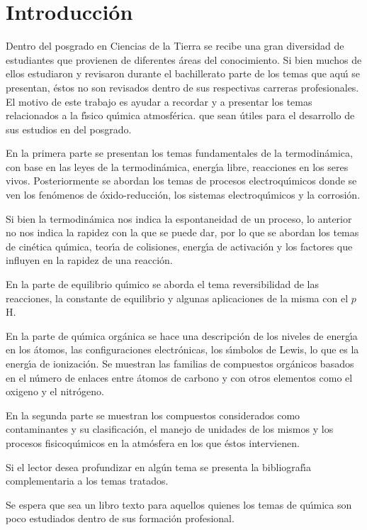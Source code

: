 \chapter*{Introducci\'on}

Dentro del posgrado en Ciencias de la Tierra se recibe una gran diversidad de estudiantes que provienen de diferentes \'areas del conocimiento. Si bien muchos de ellos estudiaron y revisaron durante el bachillerato parte de los temas que aqu\'{\i} se presentan, \'estos no son revisados dentro de sus respectivas carreras profesionales. El motivo de este trabajo es ayudar  a recordar y a presentar los temas relacionados a la f\'{\i}sico qu\'{\i}mica atmosf\'erica. que sean \'utiles para el desarrollo de sus estudios en del posgrado.

 En la primera parte se presentan los temas fundamentales de la termodin\'amica, con base en las leyes de la termodin\'amica, energ\'{\i}a libre, reacciones en los seres vivos. Posteriormente se abordan los temas de procesos electroqu\'{\i}micos donde se ven los fen\'omenos de \'oxido-reducci\'on, los sistemas electroqu\'{\i}micos y la corrosi\'on.
 
 Si bien la termodin\'amica nos indica la espontaneidad de un proceso, lo anterior no nos indica la rapidez con la que se puede dar, por lo que se abordan los temas de cin\'etica qu\'{\i}mica, teor\'{\i}a de colisiones, energ\'{\i}a de activaci\'on  y los factores que influyen en la rapidez de una reacci\'on.
 
 En la parte de equilibrio qu\'{\i}mico se aborda el tema reversibilidad de las reacciones, la constante de equilibrio y algunas aplicaciones de la misma con el $p$H.
 
 En la parte de qu\'{\i}mica org\'anica se hace una descripci\'on de los niveles de energ\'{\i}a en los \'atomos, las configuraciones electr\'onicas, los s\'{\i}mbolos de Lewis, lo que es la energ\'{\i}a de ionizaci\'on. Se muestran las familias de compuestos org\'anicos basados en el n\'umero de enlaces entre \'atomos de carbono y con otros elementos como el oxigeno y el nitr\'ogeno.
 
 En la segunda parte se muestran los compuestos considerados como contaminantes y su clasificaci\'on, el manejo de unidades de los mismos y los procesos fisicoqu\'{\i}micos  en la atm\'osfera en los que \'estos intervienen.
 
 Si el lector desea profundizar en  alg\'un tema se presenta la bibliograf\'{\i}a complementaria a los temas tratados.
 
 Se espera que sea un libro texto para aquellos quienes los temas de qu\'{\i}mica son poco estudiados dentro de sus formaci\'on profesional.
 
 